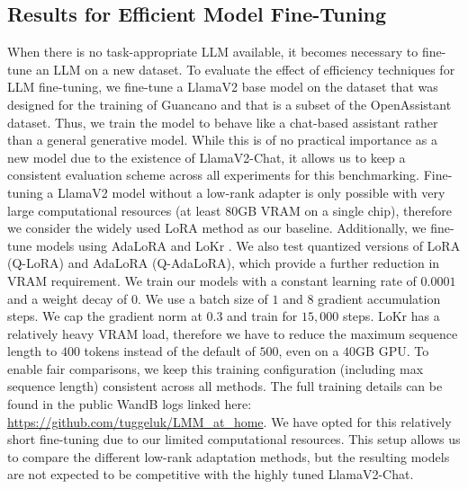 \documentclass[conference]{IEEEtran}
\begin{document}
\subsection{Results for Efficient Model Fine-Tuning}
\label{sec:bench_ft}
When there is no task-appropriate LLM available, it becomes necessary to fine-tune an LLM on a new dataset. To evaluate the effect of efficiency techniques for LLM fine-tuning, we fine-tune a LlamaV2 base model on the dataset that was designed for the training of Guancano \cite{qlora} and that is a subset of the OpenAssistant \cite{kopf_openassistant_2023} dataset. Thus, we train the model to behave like a chat-based assistant rather than a general generative model. While this is of no 
practical importance as a new model due to the existence of LlamaV2-Chat, it allows us to keep a consistent evaluation scheme across all experiments for this benchmarking.
Fine-tuning a LlamaV2 model without a low-rank adapter is only possible with very large computational resources (at least $80$GB VRAM on a single chip), therefore we consider the widely used LoRA \cite{lora} method as our baseline. Additionally, we fine-tune models using AdaLoRA \cite{adalora} and LoKr \cite{LoKr}. We also test quantized versions of LoRA (Q-LoRA) and AdaLoRA (Q-AdaLoRA), which provide a further reduction in VRAM requirement.
We train our models with a constant learning rate of $0.0001$ and a weight decay of $0$. We use a batch size of $1$ and $8$ gradient accumulation steps. We cap the gradient norm at $0.3$ and train for $15,000$ steps. LoKr has a relatively heavy VRAM load, therefore we have to reduce the maximum sequence length to $400$ tokens instead of the default of $500$, even on a $40$GB GPU. To enable fair comparisons, we keep this training configuration (including max sequence length) consistent across all methods. The full training details can be found in the public WandB logs linked here: \url{https://github.com/tuggeluk/LMM_at_home}. We have opted for this relatively short fine-tuning due to our limited computational resources. This setup allows us to compare the different low-rank adaptation methods, but the resulting models are not expected to be competitive with the highly tuned LlamaV2-Chat.  
\end{document}
